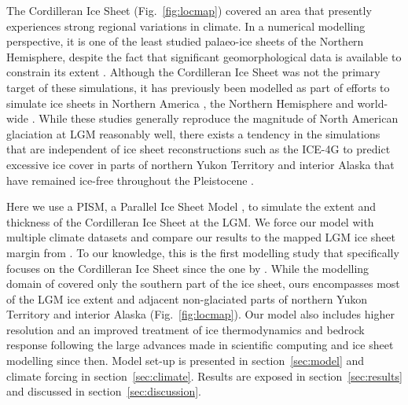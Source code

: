 The Cordilleran Ice Sheet (Fig.~\ref{fig:locmap}) covered an area that presently experiences strong regional variations in climate. In a numerical modelling perspective, it is one of the least studied palaeo-ice sheets of the Northern Hemisphere, despite the fact that significant geomorphological data is available to constrain its extent \citep{jackson-clague-1991,dukrodkin-1999,kaufman-manley-2004,kleman-etal-2010,margold-etal-2011}. Although the Cordilleran Ice Sheet was not the primary target of these simulations, it has previously been modelled as part of efforts to simulate ice sheets in Northern America \citep{marshall-clarke-1999,calov-etal-2002,tarasov-peltier-1997,tarasov-peltier-2004,gregoire-etal-2012}, the Northern Hemisphere \citep{huybrechts-tsiobbel-1996,greve-etal-1999,charbit-etal-2002,charbit-etal-2007,charbit-etal-2013,johnson-fastook-2002,rodgers-etal-2004,bintanja-etal-2005,zweck-huybrechts-2005,abeouchi-etal-2007} and world-wide \citep{yoshimori-etal-2001}. While these studies generally reproduce the magnitude of North American glaciation at LGM reasonably well, there exists a tendency in the simulations that are independent of ice sheet reconstructions such as the ICE-4G to predict excessive ice cover in parts of northern Yukon Territory and interior Alaska that have remained ice-free throughout the Pleistocene \citep{dukrodkin-1999,kaufman-manley-2004}.

Here we use a PISM, a Parallel Ice Sheet Model \citep{web:pism}, to simulate the extent and thickness of the Cordilleran Ice Sheet at the LGM. We force our model with multiple climate datasets and compare our results to the mapped LGM ice sheet margin from \citet{dyke-2004}. To our knowledge, this is the first modelling study that specifically focuses on the Cordilleran Ice Sheet since the one by \citet{robert-1991}. While the modelling domain of \citet{robert-1991} covered only the southern part of the ice sheet, ours encompasses most of the LGM ice extent and adjacent non-glaciated parts of northern Yukon Territory and interior Alaska (Fig.~\ref{fig:locmap}). Our model also includes higher resolution and an improved treatment of ice thermodynamics and bedrock response following the large advances made in scientific computing and ice sheet modelling since then. Model set-up is presented in section~\ref{sec:model} and climate forcing in section~\ref{sec:climate}. Results are exposed in section~\ref{sec:results} and discussed in section~\ref{sec:discussion}.

